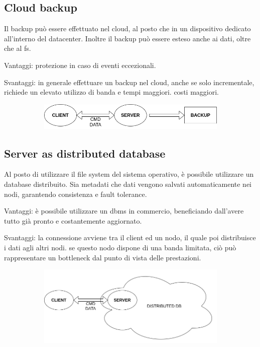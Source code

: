 \documentclass{article}
\begin{document}
\subsection{Cloud backup}

Il backup può essere effettuato nel cloud, al posto che in un dispositivo dedicato all'interno del datacenter. Inoltre il backup può essere esteso anche ai dati, oltre che al fs. 


Vantaggi: protezione in caso di eventi eccezionali. 

Svantaggi: in generale effettuare un backup nel cloud, anche se solo incrementale, richiede un elevato utilizzo di banda e tempi maggiori. costi maggiori. 

\begin{figure}[H]
	\centering
	\begin{subfigure}{0.80\linewidth}
		\includegraphics[width=\linewidth]{../diagrams/architettura/3.png}
	\end{subfigure}
\end{figure}



\subsection{Server as distributed database}

Al posto di utilizzare il file system del sistema operativo, è possibile utilizzare un database distribuito. Sia metadati che dati vengono salvati automaticamente nei nodi, garantendo consistenza e fault tolerance. 

Vantaggi: è possibile utilizzare un dbms in commercio, beneficiando dall'avere tutto già pronto e costantemente aggiornato.

Svantaggi: la connessione avviene tra il client ed un nodo, il quale poi distribuisce i dati agli altri nodi. se questo nodo dispone di una banda limitata, ciò può rappresentare un bottleneck dal punto di vista delle prestazioni. 

\begin{figure}[H]
	\centering
	\begin{subfigure}{0.80\linewidth}
		\includegraphics[width=\linewidth]{../diagrams/architettura/4.png}
	\end{subfigure}
\end{figure}
\end{document}
